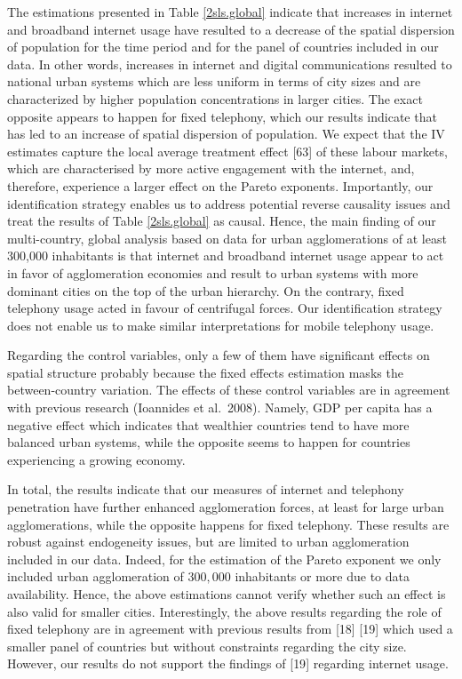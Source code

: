\documentclass[10pt,letterpaper]{article}
\begin{document}
The estimations presented in Table \ref{2sls.global} indicate that
increases in internet and broadband internet usage have resulted to a
decrease of the spatial dispersion of population for the time period and
for the panel of countries included in our data. In other words,
increases in internet and digital communications resulted to national
urban systems which are less uniform in terms of city sizes and are
characterized by higher population concentrations in larger cities. The
exact opposite appears to happen for fixed telephony, which our results
indicate that has led to an increase of spatial dispersion of
population. \color{blue} We expect that the IV estimates capture the
local average treatment effect {[}63{]} of these labour markets, which
are characterised by more active engagement with the internet, and,
therefore, experience a larger effect on the Pareto exponents.
\color{black} Importantly, our identification strategy enables us to
address potential reverse causality issues and treat the results of
Table \ref{2sls.global} as causal. Hence, the main finding of our
multi-country, global analysis based on data for urban agglomerations of
at least 300,000 inhabitants is that internet and broadband internet
usage appear to act in favor of agglomeration economies and result to
urban systems with more dominant cities on the top of the urban
hierarchy. On the contrary, fixed telephony usage acted in favour of
centrifugal forces. Our identification strategy does not enable us to
make similar interpretations for mobile telephony usage.

Regarding the control variables, only a few of them have significant
effects on spatial structure probably because the fixed effects
estimation masks the between-country variation. The effects of these
control variables are in agreement with previous research (Ioannides et
al.~2008). Namely, GDP per capita has a negative effect which indicates
that wealthier countries tend to have more balanced urban systems, while
the opposite seems to happen for countries experiencing a growing
economy.

In total, the results indicate that our measures of internet and
telephony penetration have further enhanced agglomeration forces, at
least for large urban agglomerations, while the opposite happens for
fixed telephony. These results are robust against endogeneity issues,
but are limited to urban agglomeration included in our data. Indeed, for
the estimation of the \color{blue} Pareto exponent \color{black} we only
included urban agglomeration of \(300,000\) inhabitants or more due to
data availability. Hence, the above estimations cannot verify whether
such an effect is also valid for smaller cities. Interestingly, the
above results regarding the role of fixed telephony are in agreement
with previous results from {[}18{]} {[}19{]} which used a smaller panel
of countries but without constraints regarding the city size. However,
our results do not support the findings of {[}19{]} regarding internet
usage.
\end{document}
